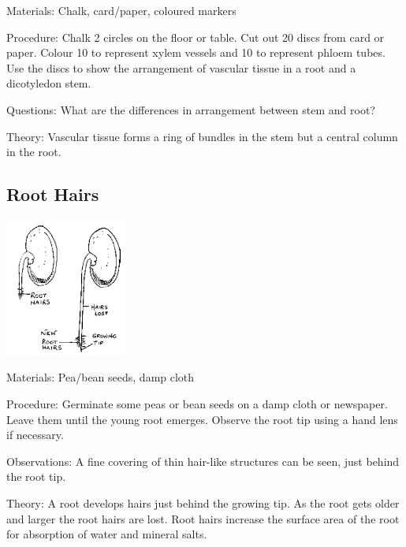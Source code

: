 \begin{multicols}{2}
\begin{description*}
\item[Materials:]{Chalk, card/paper, coloured markers}
\item[Procedure:]{Chalk 2 circles on the floor or
table. Cut out 20 discs from card
or paper. Colour 10 to represent
xylem vessels and 10 to represent
phloem tubes. Use the discs
to show the arrangement of
vascular tissue in a root and a
dicotyledon stem.}
\item[Questions:]{What are the differences in arrangement between stem and root?}
\item[Theory:]{Vascular tissue forms a ring of bundles in the stem but a central column in the root.}
\end{description*}

\subsection{Root Hairs} %

\begin{center}
\includegraphics[width=0.3\textwidth]{./img/source/root-hairs.png}
\end{center}

\begin{description*}
\item[Materials:]{Pea/bean seeds, damp cloth}
\item[Procedure:]{Germinate some peas or bean seeds on a damp cloth or newspaper. Leave them until the
young root emerges. Observe the root tip using a hand lens if necessary.}
\item[Observations:]{A fine covering of thin hair-like structures can be seen, just behind the root tip.}
\item[Theory:]{A root develops hairs just behind the growing tip. As the root gets older and larger the root
hairs are lost. Root hairs increase the surface area of the root for absorption of water and
mineral salts.}
\end{description*}


\end{multicols}

